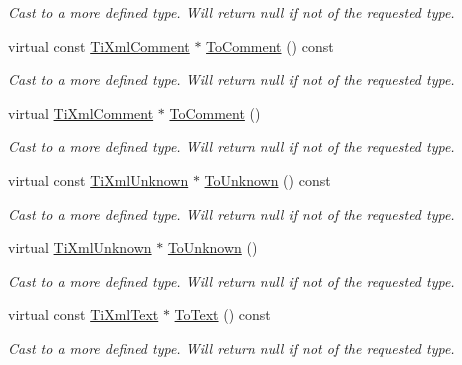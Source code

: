 \begin{DoxyCompactItemize}
\begin{DoxyCompactList}\small\item\em Cast to a more defined type. Will return null if not of the requested type. \item\end{DoxyCompactList}\item 
virtual const \hyperlink{classTiXmlComment}{TiXmlComment} $\ast$ \hyperlink{classTiXmlNode_aa0a5086f9eaee910bbfdc7f975e26574}{ToComment} () const 
\begin{DoxyCompactList}\small\item\em Cast to a more defined type. Will return null if not of the requested type. \item\end{DoxyCompactList}\item 
virtual \hyperlink{classTiXmlComment}{TiXmlComment} $\ast$ \hyperlink{classTiXmlNode_a383e06a0787f7063953934867990f849}{ToComment} ()
\begin{DoxyCompactList}\small\item\em Cast to a more defined type. Will return null if not of the requested type. \item\end{DoxyCompactList}\item 
virtual const \hyperlink{classTiXmlUnknown}{TiXmlUnknown} $\ast$ \hyperlink{classTiXmlNode_afd7205cf31d7a376929f8a36930627a2}{ToUnknown} () const 
\begin{DoxyCompactList}\small\item\em Cast to a more defined type. Will return null if not of the requested type. \item\end{DoxyCompactList}\item 
virtual \hyperlink{classTiXmlUnknown}{TiXmlUnknown} $\ast$ \hyperlink{classTiXmlNode_a06de5af852668c7e4af0d09c205f0b0d}{ToUnknown} ()
\begin{DoxyCompactList}\small\item\em Cast to a more defined type. Will return null if not of the requested type. \item\end{DoxyCompactList}\item 
virtual const \hyperlink{classTiXmlText}{TiXmlText} $\ast$ \hyperlink{classTiXmlNode_a95a46a52c525992d6b4ee08beb14cd69}{ToText} () const 
\begin{DoxyCompactList}\small\item\em Cast to a more defined type. Will return null if not of the requested type. \item\end{DoxyCompactList}\item 

\end{DoxyCompactItemize}

